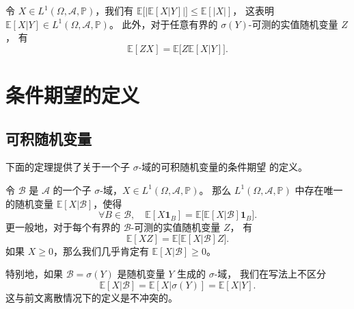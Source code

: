 \documentclass[fontset=none]{Notes}
\newcommand{\indicator}[1]{\mathbold 1_{#1}}
\begin{document}
\begin{proposition}
  令 $X\in L^1(\Omega, \mathcal{A},\mathbb{P})$，我们有
  $\mathbb{E}\bigl[\bigl|\mathbb{E}[X|Y]\bigr|\bigr]\leq \mathbb{E}[|X|]$，
  这表明 $\mathbb{E}[X|Y]\in L^1(\Omega,\mathcal{A},\mathbb{P})$。
  此外，对于任意有界的 $\sigma(Y)$-可测的实值随机变量 $Z$，
  有
  \[
    \mathbb{E}[ZX]=\mathbb{E}\bigl[Z \mathbb{E}[X|Y]\bigr]  .
  \]
\end{proposition}

\section{条件期望的定义}

\subsection{可积随机变量}

下面的定理提供了关于一个子 $\sigma$-域的可积随机变量的条件期望
的定义。

\begin{theorem}\label{thm:conditioning variable}
  令 $\mathcal{B}$ 是 $\mathcal{A}$ 的一个子 $\sigma$-域，$X\in L^1(\Omega,\mathcal{A},\mathbb{P})$。
  那么 $L^1(\Omega,\mathcal{A},\mathbb{P})$ 中存在唯一的随机变量
  $\mathbb{E}[X| \mathcal{B}]$，使得
  \[
    \forall B\in \mathcal{B},\quad
    \mathbb{E}[X \indicator{B}]=\mathbb{E}\bigl[\mathbb{E}[X| \mathcal{B}]\indicator{B}\bigr]  .
  \]
  更一般地，对于每个有界的 $\mathcal{B}$-可测的实值随机变量 $Z$，
  有
  \[
    \mathbb{E}[XZ]=\mathbb{E}\bigl[\mathbb{E}[X| \mathcal{B}]Z\bigr]  .
  \]
  如果 $X\geq 0$，那么我们几乎肯定有 $\mathbb{E}[X| \mathcal{B}]\geq 0$。
\end{theorem}

特别地，如果 $\mathcal{B}=\sigma(Y)$ 是随机变量 $Y$ 生成的 $\sigma$-域，
我们在写法上不区分
\[
  \mathbb{E}[X| \mathcal{B}] = \mathbb{E}[X|\sigma(Y)]
  =\mathbb{E}[X|Y].
\]
这与前文离散情况下的定义是不冲突的。
\end{document}
